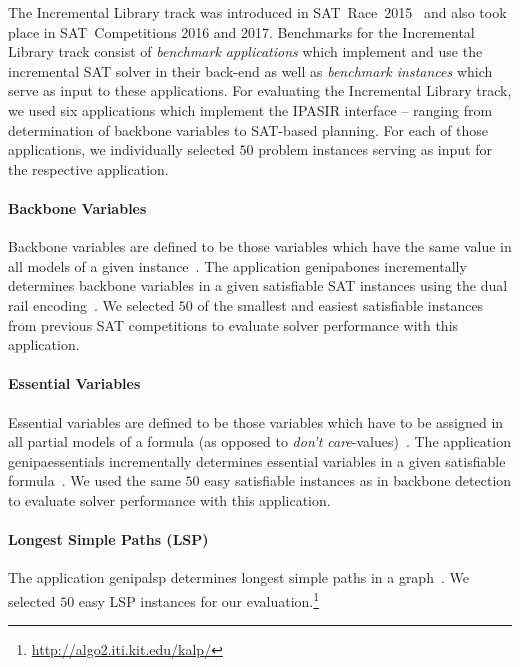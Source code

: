 \documentclass{elsarticle}
\begin{document}
The Incremental Library track was introduced in SAT~Race~2015~\cite{Balyo:2015:SATRace} and also took place in SAT~Competitions 2016 and 2017.
Benchmarks for the Incremental Library track consist of \emph{benchmark applications} which implement and use the incremental SAT solver in their back-end as well as \emph{benchmark instances} which serve as input to these applications. 
For evaluating the Incremental Library track, we used six applications which implement the IPASIR interface -- ranging from determination of backbone variables to SAT-based planning. 
For each of those applications, we individually selected $50$ problem instances serving as input for the respective application. 

\paragraph{Backbone Variables}

Backbone variables are defined to be those variables which have the same value in all models of a given instance~\cite{Janota:2015:Backbones}. 
The application \textsf{genipabones} incrementally determines backbone variables in a given satisfiable SAT instances using the dual rail encoding~\cite{Balyo:2015:SATRace}.
We selected $50$ of the smallest and easiest satisfiable instances from previous SAT competitions to evaluate solver performance with this application. 

\paragraph{Essential Variables}

Essential variables are defined to be those variables which have to be assigned in all partial models of a formula (as opposed to \emph{don't care}-values)~\cite{Bryant:1987:Essentials}. 
The application \textsf{genipaessentials} incrementally determines essential variables in a given satisfiable formula~\cite{Balyo:2015:SATRace}. 
We used the same $50$ easy satisfiable instances as in backbone detection to evaluate solver performance with this application. 

\paragraph{Longest Simple Paths (LSP)}

The application \textsf{genipalsp} determines longest simple paths in a graph~\cite{Balyo:2019:LSP}. 
We selected $50$ easy LSP instances for our evaluation.\footnote{\url{http://algo2.iti.kit.edu/kalp/}} 
\end{document}
